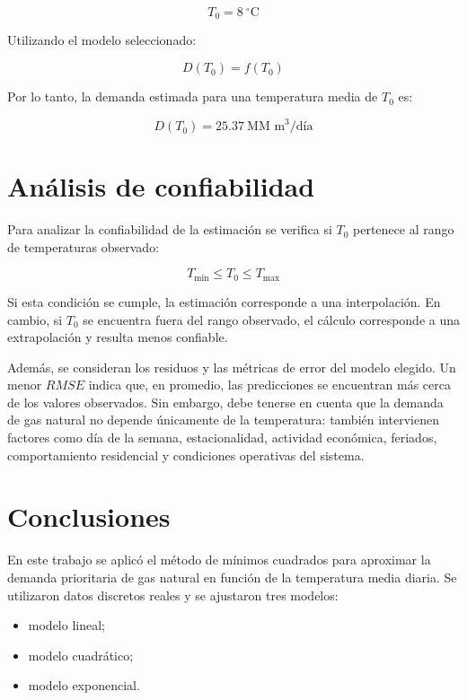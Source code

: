\documentclass[12pt,a4paper]{article}
\newcommand{\unidadDemanda}{\text{MM m}^3/\text{día}}
\newcommand{\unidadTemp}{^\circ\text{C}}
\begin{document}
\[
    T_0 = \boxed{8} \ \unidadTemp
\]

Utilizando el modelo seleccionado:

\[
    D(T_0)=f(T_0)
\]

\begin{table}[H]
\centering
\caption{Estimación final}
\label{tab:estimacion-final}

\end{table}

Por lo tanto, la demanda estimada para una temperatura media de \(T_0\) es:

\[
    \boxed{D(T_0)=\num{25.37} \ \unidadDemanda}
\]

\section{Análisis de confiabilidad}

Para analizar la confiabilidad de la estimación se verifica si \(T_0\) pertenece al rango de temperaturas observado:

\[
    T_{\min} \leq T_0 \leq T_{\max}
\]

Si esta condición se cumple, la estimación corresponde a una interpolación. En cambio, si \(T_0\) se encuentra fuera del rango observado, el cálculo corresponde a una extrapolación y resulta menos confiable.

Además, se consideran los residuos y las métricas de error del modelo elegido. Un menor \(RMSE\) indica que, en promedio, las predicciones se encuentran más cerca de los valores observados. Sin embargo, debe tenerse en cuenta que la demanda de gas natural no depende únicamente de la temperatura: también intervienen factores como día de la semana, estacionalidad, actividad económica, feriados, comportamiento residencial y condiciones operativas del sistema.

\section{Conclusiones}

En este trabajo se aplicó el método de mínimos cuadrados para aproximar la demanda prioritaria de gas natural en función de la temperatura media diaria. Se utilizaron datos discretos reales y se ajustaron tres modelos:

\begin{itemize}
    \item modelo lineal;
    \item modelo cuadrático;
    \item modelo exponencial.
\end{itemize}
\end{document}
